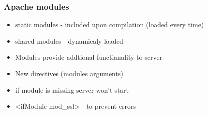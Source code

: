 \begin{frame}[fragile]
        \frametitle{Apache modules}
\begin{itemize}
    \item \alert{static modules} - included upon compilation (loaded every time)
    \item \alert{shared modules} - dynamicaly loaded 
\end{itemize}
\begin{itemize}
    \item 
	Modules provide \alert{addtional functianality} to server
    \item 
        New directives (modules arguments)
    \item 
	if module is missing server won't start
    \item 
	<ifModule mod\_ssl> - to prevent errors
\end{itemize}

\end{frame}
